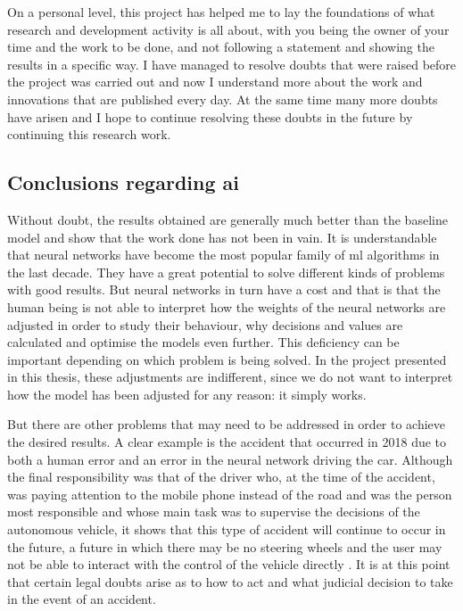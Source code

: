 On a personal level, this project has helped me to lay the foundations of what research and development activity is all about, with you being the owner of your time and the work to be done, and not following a statement and showing the results in a specific way. I have managed to resolve doubts that were raised before the project was carried out and now I understand more about the work and innovations that are published every day. At the same time many more doubts have arisen and I hope to continue resolving these doubts in the future by continuing this research work.
\newline

\subsection{Conclusions regarding \acrshort{ai}}

Without doubt, the results obtained are generally much better than the baseline model and show that the work done has not been in vain. It is understandable that neural networks have become the most popular family of \acrlong{ml} algorithms in the last decade. They have a great potential to solve different kinds of problems with good results. But neural networks in turn have a cost and that is that the human being is not able to interpret how the weights of the neural networks are adjusted in order to study their behaviour, why decisions and values are calculated and optimise the models even further. This deficiency can be important depending on which problem is being solved. In the project presented in this thesis, these adjustments are indifferent, since we do not want to interpret how the model has been adjusted for any reason: it simply works.
\newline

But there are other problems that may need to be addressed in order to achieve the desired results. A clear example is the accident that occurred in 2018 \cite{uber} due to both a human error and an error in the neural network driving the car. Although the final responsibility was that of the driver who, at the time of the accident, was paying attention to the mobile phone instead of the road and was the person most responsible and whose main task was to supervise the decisions of the autonomous vehicle, it shows that this type of accident will continue to occur in the future, a future in which there may be no steering wheels and the user may not be able to interact with the control of the vehicle directly \cite{nowheel}. It is at this point that certain legal doubts arise as to how to act and what judicial decision to take in the event of an accident.
\newline


